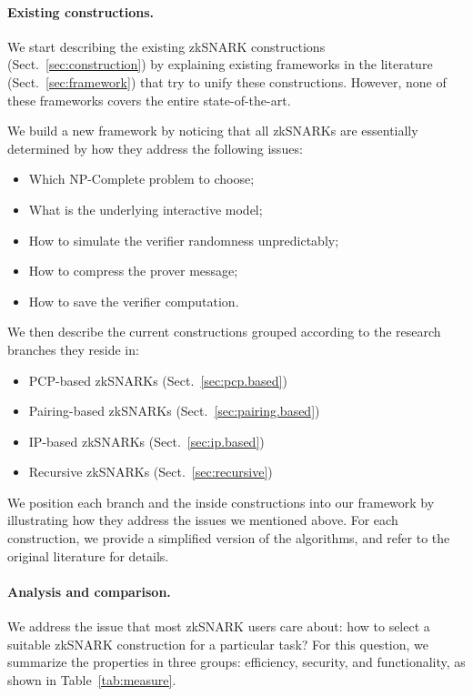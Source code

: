 \documentclass[acmtog]{acmart}
\begin{document}
\paragraph{Existing constructions.}
We start describing the existing zkSNARK constructions (Sect.~\ref{sec:construction}) by explaining existing frameworks in the literature (Sect.~\ref{sec:framework}) that try to unify these constructions.
However, none of these frameworks covers the entire state-of-the-art.

We build a new framework by noticing that all zkSNARKs are essentially determined by how they address the following issues:
\begin{itemize}
	\item Which NP-Complete problem to choose;
	\item What is the underlying interactive model;
	\item How to simulate the verifier randomness unpredictably;
	\item How to compress the prover message;
	\item How to save the verifier computation.
\end{itemize}

We then describe the current constructions grouped according to the research branches they reside in:
\begin{itemize}
	\item PCP-based zkSNARKs (Sect.~\ref{sec:pcp.based})
	\item Pairing-based zkSNARKs (Sect.~\ref{sec:pairing.based})
	\item IP-based zkSNARKs (Sect.~\ref{sec:ip.based})
	\item Recursive zkSNARKs (Sect.~\ref{sec:recursive})
\end{itemize}
We position each branch and the inside constructions into our framework by illustrating how they address the issues we mentioned above.
For each construction, we provide a simplified version of the algorithms, and refer to the original literature for details.

\paragraph{Analysis and comparison.}
We address the issue that most zkSNARK users care about: how to select a suitable zkSNARK construction for a particular task?
For this question, we summarize the properties in three groups: efficiency, security, and functionality, as shown in Table~\ref{tab:measure}.
\end{document}
